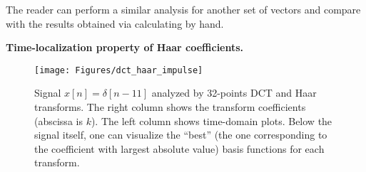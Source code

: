 The reader can perform a similar analysis for another set of vectors and compare with the results obtained via calculating by hand.
\eApplication
\fi

\bApplication \textbf{Time-localization property of Haar coefficients.}
\label{app:haar_transform}

\begin{figure}[!htb]
        \centering
                \texttt{[image: Figures/dct\_haar\_impulse]}            
        \caption[{Signal $x[n]=\delta[n-11]$ analyzed by 32-points DCT and Haar transforms.}]{Signal $x[n]=\delta[n-11]$ analyzed by 32-points DCT and Haar transforms. The right column shows the transform coefficients (abscissa is $k$). The left column shows time-domain plots. Below the signal itself, one can visualize the ``best'' (the one corresponding to the coefficient with largest absolute value) basis functions for each transform.\label{fig:dct_haar_impulse}}
\end{figure}


